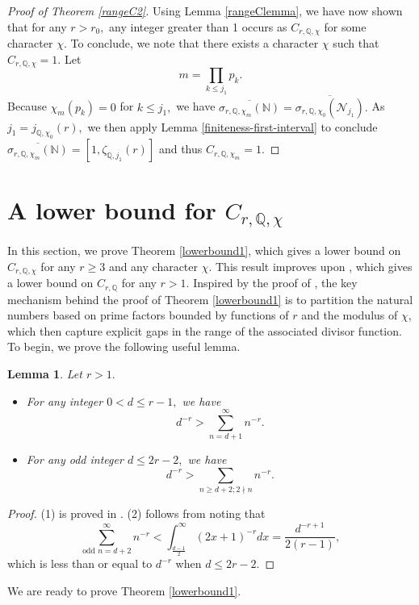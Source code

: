 \documentclass[12pt]{amsart}
\newtheorem{lemma}[theorem]{Lemma}
\theoremstyle{definition}
\numberwithin{equation}{section}
\newcommand{\Q}{\mathbb{Q}}
\newcommand{\N}{\mathbb{N}}
\begin{document}
\begin{proof}[Proof of Theorem \ref{rangeC2}]
    Using Lemma \ref{rangeClemma}, we have now shown that for any $r > r_0,$ any integer greater than 1 occurs as $C_{r,\Q,\chi}$ for some character $\chi$. To conclude, we note that there exists a character $\chi$ such that $C_{r,\Q,\chi} = 1.$ Let $$m = \prod_{k \leq j_1} p_k.$$ Because $\chi_m(p_k)=0$ for $k\leq j_1,$ we have $\overline{\sigma_{r,\Q,\chi_m} ( \N)} = \overline{\sigma_{r,\Q,\chi_0}(\mathcal N_{j_1})}.$ As $j_1 = j_{\Q,\chi_0}(r),$ we then apply Lemma \ref{finiteness-first-interval} to conclude $\overline{\sigma_{r,\Q,\chi_m} ( \N)}= [ 1, \zeta_{\Q,j_1}(r)]$ and thus $C_{r,\Q,\chi_m} =1.$
\end{proof}

\section{A lower bound for $C_{r,\Q,\chi}$} \label{section-lower-1}

In this section, we prove Theorem \ref{lowerbound1}, which gives a lower bound on $C_{r,\Q,\chi}$ for any $r \geq 3$ and any character $\chi$. This result improves upon \cite[Theorem 5.2]{AB19}, which gives a lower bound on $C_{r,\Q}$ for any $r > 1$. Inspired by the proof of \cite[Theorem 5.2]{AB19}, the key mechanism behind the proof of Theorem \ref{lowerbound1} is to partition the natural numbers based on prime factors bounded by functions of $r$ and the modulus of $\chi$, which then capture explicit gaps in the range of the associated divisor function. 
To begin, we prove the following useful lemma. 

\begin{lemma} \label{tail}
    Let $r > 1.$
    \begin{itemize}
        \item[(1)] For any integer $0 < d \leq r-1,$ we have $$d^{-r} > \sum_{n = d+1}^\infty n^{-r}.$$
        \item[(2)] For any odd integer $d \leq 2r-2,$ we have $$d^{-r} > \sum_{n \geq d+2; 2 \nmid n} n^{-r}.$$ 
    \end{itemize}
\end{lemma}

\begin{proof}
    (1) is proved in \cite[Lemma 5.1]{AB19}. (2) follows from noting that $$\sum_{\text{odd } n = d+2}^\infty n^{-r} < \int_{\frac{d-1}{2}}^\infty (2x+1)^{-r} dx = \frac{d^{-r+1}}{2(r-1)},$$ which is less than or equal to $d^{-r}$ when $d \leq 2r-2.$
\end{proof}
We are ready to prove Theorem \ref{lowerbound1}.
\end{document}
